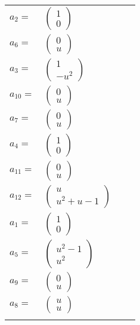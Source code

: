 \documentclass[1p]{elsarticle_modified}
\theoremstyle{definition}
\begin{document}
\begin{tabular}{m{7pt} m{180pt} m{7pt} m{180pt} }
\flushright $a_{2}=$&$\begin{pmatrix}1\\0\end{pmatrix}$ \\
\flushright $a_{6}=$&$\begin{pmatrix}0\\u\end{pmatrix}$ \\
\flushright $a_{3}=$&$\begin{pmatrix}1\\- u^2\end{pmatrix}$ \\
\flushright $a_{10}=$&$\begin{pmatrix}0\\u\end{pmatrix}$ \\
\flushright $a_{7}=$&$\begin{pmatrix}0\\u\end{pmatrix}$ \\
\flushright $a_{4}=$&$\begin{pmatrix}1\\0\end{pmatrix}$ \\
\flushright $a_{11}=$&$\begin{pmatrix}0\\u\end{pmatrix}$ \\
\flushright $a_{12}=$&$\begin{pmatrix}u\\u^2+u-1\end{pmatrix}$ \\
\flushright $a_{1}=$&$\begin{pmatrix}1\\0\end{pmatrix}$ \\
\flushright $a_{5}=$&$\begin{pmatrix}u^2-1\\u^2\end{pmatrix}$ \\
\flushright $a_{9}=$&$\begin{pmatrix}0\\u\end{pmatrix}$ \\
\flushright $a_{8}=$&$\begin{pmatrix}u\\u\end{pmatrix}$\\&\end{tabular}
\end{document}
